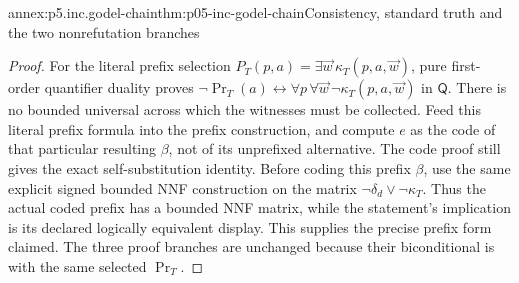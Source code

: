 \begin{annexitem}{annex:p5.inc.godel-chain}{thm:p05-inc-godel-chain}{Consistency, standard truth and the two nonrefutation branches}
\begin{proof}
For the literal prefix selection
\(P_T(p,a)=\exists\vec w\,\kappa_T(p,a,\vec w)\), pure first-order
quantifier duality proves
\(\neg\operatorname{Pr}_T(a)\leftrightarrow
\forall p\,\forall\vec w\,\neg\kappa_T(p,a,\vec w)\)
in \(\mathsf Q\). There is no bounded universal across which the
witnesses must be collected. Feed this literal prefix formula into
the prefix construction, and compute \(e\) as the code of that
particular resulting \(\beta\), not of its unprefixed alternative.
The code proof still gives the exact self-substitution identity.
Before coding this prefix \(\beta\), use the same explicit signed
bounded NNF construction on the matrix
\(\neg\delta_d\lor\neg\kappa_T\). Thus the actual coded prefix
has a bounded NNF matrix, while the statement's implication is its
declared logically equivalent display. This supplies the precise
prefix form claimed. The three proof branches are unchanged because
their biconditional is with the same selected \(\operatorname{Pr}_T\).
\end{proof}
\end{annexitem}

